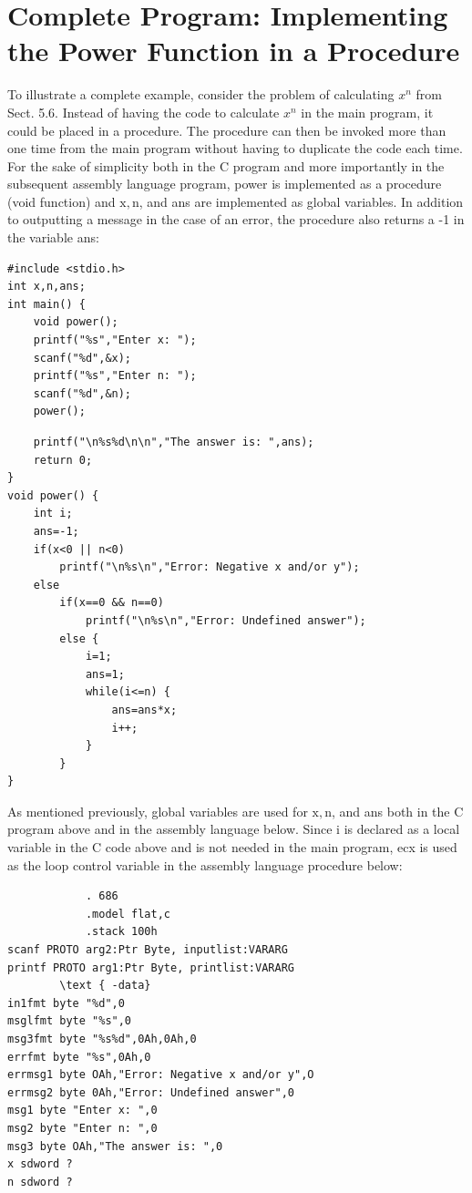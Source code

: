 \documentclass[10pt]{book}
\begin{document}
\section{Complete Program: Implementing the Power Function in a Procedure}
To illustrate a complete example, consider the problem of calculating $x^{n}$ from Sect. 5.6. Instead of having the code to calculate $x^{n}$ in the main program, it could be placed in a procedure. The procedure can then be invoked more than one time from the main program without having to duplicate the code each time. For the sake of simplicity both in the C program and more importantly in the subsequent assembly language program, power is implemented as a procedure (void function) and $\mathrm{x}, \mathrm{n}$, and ans are implemented as global variables. In addition to outputting a message in the case of an error, the procedure also returns a -1 in the variable ans:

\begin{verbatim}
#include <stdio.h>
int x,n,ans;
int main() {
    void power();
    printf("%s","Enter x: ");
    scanf("%d",&x);
    printf("%s","Enter n: ");
    scanf("%d",&n);
    power();
\end{verbatim}

\begin{verbatim}
    printf("\n%s%d\n\n","The answer is: ",ans);
    return 0;
}
void power() {
    int i;
    ans=-1;
    if(x<0 || n<0)
        printf("\n%s\n","Error: Negative x and/or y");
    else
        if(x==0 && n==0)
            printf("\n%s\n","Error: Undefined answer");
        else {
            i=1;
            ans=1;
            while(i<=n) {
                ans=ans*x;
                i++;
            }
        }
}
\end{verbatim}

As mentioned previously, global variables are used for $\mathrm{x}, \mathrm{n}$, and ans both in the C program above and in the assembly language below. Since i is declared as a local variable in the C code above and is not needed in the main program, ecx is used as the loop control variable in the assembly language procedure below:

\begin{verbatim}
            . 686
            .model flat,c
            .stack 100h
scanf PROTO arg2:Ptr Byte, inputlist:VARARG
printf PROTO arg1:Ptr Byte, printlist:VARARG
        \text { -data}
in1fmt byte "%d",0
msglfmt byte "%s",0
msg3fmt byte "%s%d",0Ah,0Ah,0
errfmt byte "%s",0Ah,0
errmsg1 byte OAh,"Error: Negative x and/or y",O
errmsg2 byte 0Ah,"Error: Undefined answer",0
msg1 byte "Enter x: ",0
msg2 byte "Enter n: ",0
msg3 byte OAh,"The answer is: ",0
x sdword ?
n sdword ?
\end{verbatim}
\end{document}
